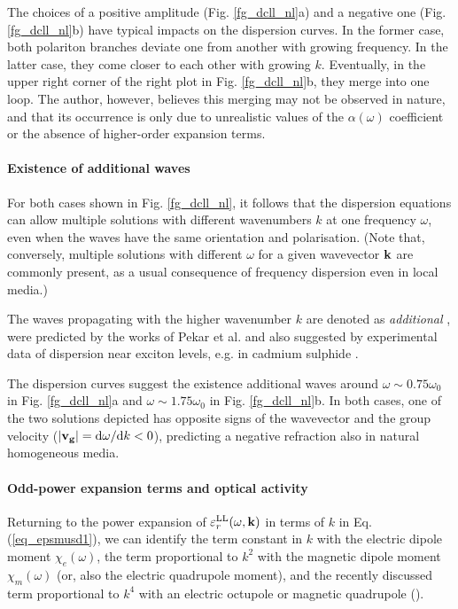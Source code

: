 The choices of a positive amplitude (Fig. \ref{fg_dcll_nl}a) and a negative one (Fig. \ref{fg_dcll_nl}b) have typical impacts on the dispersion curves. In the former case, both polariton branches deviate one from another with growing frequency. In the latter case, they come closer to each other with growing $k$. Eventually, in the upper right corner of the right plot in Fig. \ref{fg_dcll_nl}b, they merge into one loop. The author, however, believes this merging may not be observed in nature, and that its occurrence is only due to unrealistic values of the $\alpha(\omega)$ coefficient or the absence of higher-order expansion terms.

\paragraph{Existence of additional waves}   %
For both cases shown in Fig. \ref{fg_dcll_nl}, it follows that the dispersion equations can allow multiple solutions with different wavenumbers $k$ at one frequency $\omega$, even when the waves have the same orientation and polarisation. (Note that, conversely, multiple solutions with different $\omega$ for a given wavevector ${\mathbf{k}}$ are commonly present, as a usual consequence of frequency dispersion even in local media.)

The waves propagating with the higher wavenumber $k$ are denoted as \textit{additional} \cite{agranovich2006spatial, agranovich2004linear, krowne2007book, agranovich1962crystal}, were predicted by the works of Pekar et al. and also suggested by experimental data of dispersion near exciton levels, e.g. in cadmium sulphide \cite{pekar1975spatial}. 

The dispersion curves suggest the existence additional waves around $\omega \sim 0.75 \omega_0$ in  Fig. \ref{fg_dcll_nl}a and $\omega \sim 1.75 \omega_0$ in  Fig. \ref{fg_dcll_nl}b. In both cases, one of the two solutions depicted has opposite signs of the wavevector and the group velocity ($|{\mathbf{v_g}}| = \mathrm{d}\omega/\mathrm{d}k < 0$), predicting a negative refraction also in natural homogeneous media.

\paragraph{Odd-power expansion terms and optical activity }   %
Returning to the power expansion of $\varepsilon_r^\text{LL}(\omega, {\mathbf{k}})$ in terms of $k$ in Eq. (\ref{eq_epsmusd1}), we can identify the term constant in $k$ with the electric dipole moment $\chi_e(\omega)$, the term proportional to $k^2$ with the magnetic dipole moment $\chi_m(\omega)$ (or, also the electric quadrupole moment), and the recently discussed term proportional to $k^4$ with an electric octupole or magnetic quadrupole (\cite{agranovich2006spatial, agranovich2004linear, krowne2007book}).

